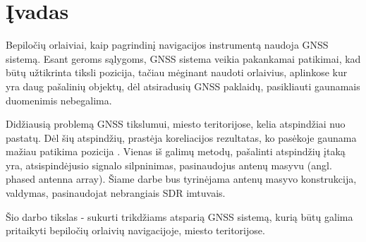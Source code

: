 \documentclass[../gnss_interference_resistant_thesis.tex]{subfiles}
\begin{document}
\section*{Įvadas}

Bepiločių orlaiviai, kaip pagrindinį navigacijos instrumentą naudoja
GNSS sistemą. Esant geroms sąlygoms, GNSS sistema veikia pakankamai
patikimai, kad būtų užtikrinta tiksli pozicija,
tačiau mėginant naudoti orlaivius, aplinkose kur yra daug
pašalinių objektų, dėl atsiradusių GNSS paklaidų, pasikliauti gaunamais
duomenimis nebegalima.

Didžiausią problemą GNSS tikslumui, miesto teritorijose, kelia
atspindžiai nuo pastatų. Dėl šių atspindžių, prastėja
koreliacijos rezultatas, ko pasėkoje gaunama mažiau patikima
pozicija \cite{Vagle2016}. Vienas iš galimų metodų,
pašalinti atspindžių įtaką yra, atsispindėjusio signalo
silpninimas, pasinaudojus antenų masyvu (angl. phased antenna array).
Šiame darbe bus tyrinėjama antenų masyvo konstrukcija,
valdymas, pasinaudojat nebrangiais SDR imtuvais.

Šio darbo tikslas - sukurti trikdžiams atsparią GNSS sistemą,
kurią būtų galima pritaikyti bepiločių orlaivių navigacijoje, miesto
teritorijose.
\end{document}
